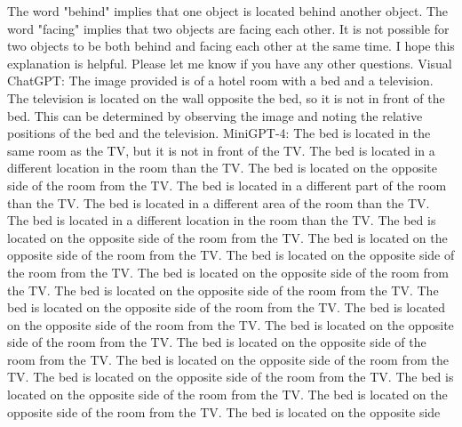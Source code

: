 \begin{enumerate}
    The word "behind" implies that one object is located behind another object.
    The word "facing" implies that two objects are facing each other.
    It is not possible for two objects to be both behind and facing each other at the same time.
    I hope this explanation is helpful. Please let me know if you have any other questions.
    \subitem Visual ChatGPT: The image provided is of a hotel room with a bed and a television. The television is located on the wall opposite the bed, so it is not in front of the bed. This can be determined by observing the image and noting the relative positions of the bed and the television.
    \subitem MiniGPT-4: The bed is located in the same room as the TV, but it is not in front of the TV. The bed is located in a different location in the room than the TV. The bed is located on the opposite side of the room from the TV. The bed is located in a different part of the room than the TV. The bed is located in a different area of the room than the TV. The bed is located in a different location in the room than the TV. The bed is located on the opposite side of the room from the TV. The bed is located on the opposite side of the room from the TV. The bed is located on the opposite side of the room from the TV. The bed is located on the opposite side of the room from the TV. The bed is located on the opposite side of the room from the TV. The bed is located on the opposite side of the room from the TV. The bed is located on the opposite side of the room from the TV. The bed is located on the opposite side of the room from the TV. The bed is located on the opposite side of the room from the TV. The bed is located on the opposite side of the room from the TV. The bed is located on the opposite side of the room from the TV. The bed is located on the opposite side of the room from the TV. The bed is located on the opposite side of the room from the TV. The bed is located on the opposite side
\end{enumerate}
